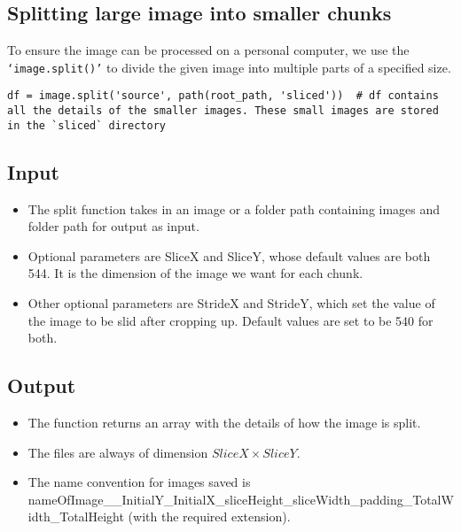 \subsection{Splitting large image into smaller chunks}
To ensure the image can be processed on a personal computer, we use the \texttt{`image.split()'} to divide the given image into multiple parts of a specified size.

\begin{verbatim}
df = image.split('source', path(root_path, 'sliced'))  # df contains all the details of the smaller images. These small images are stored in the `sliced` directory
\end{verbatim}

\subsection*{Input}
\begin{itemize}
  \setlength\itemsep{1mm}
  \item The split function takes in an image or a folder path containing images and folder path for output as input.
  \item Optional parameters are SliceX and SliceY, whose default values are both 544. It is the dimension of the image we want for each chunk.
  \item Other optional parameters are StrideX and StrideY, which set the value of the image to be slid after cropping up. Default values are set to be 540 for both.
\end{itemize}

\subsection*{Output}
\begin{itemize}
  \setlength\itemsep{1mm}
  \item The function returns an array with the details of how the image is split.
  \item The files are always of dimension $SliceX\times SliceY$.
  \item The name convention for images saved is \newline
    nameOfImage\_\_InitialY\_InitialX\_sliceHeight\_sliceWidth\_padding\_TotalWidth\_TotalHeight \newline
    (with the required extension).
\end{itemize}


